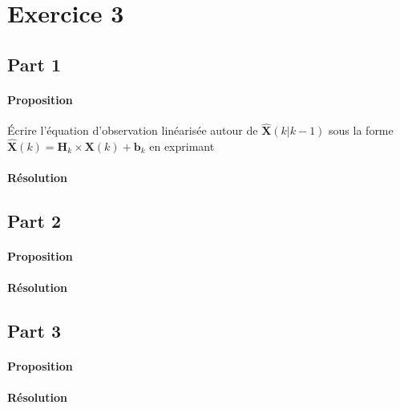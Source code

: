 \documentclass{article}
\begin{document}
\begin{scriptsize}\mycode
    
\end{scriptsize}

\begin{scriptsize}\mycode
    
\end{scriptsize}


\section{Exercice 3}
\subsection{Part 1}
\paragraph{Proposition}Écrire l'équation d'observation linéarisée autour de $\hat{\mathbf{X}}(k | k-1)$ sous la forme $\hat{\mathbf{X}}(k) = \mathbf{H}_{k} \times \mathbf{X}(k) + \mathbf{b}_{k}$ en exprimant 

\paragraph{Résolution}


\subsection{Part 2}
\paragraph{Proposition}

\paragraph{Résolution}


\subsection{Part 3}
\paragraph{Proposition}

\paragraph{Résolution}
\end{document}
